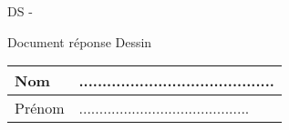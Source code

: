 \documentclass[12pt,landscape]{article}
\begin{document}
\pagestyle{empty}

\begin{minipage}{0.49\linewidth}

\end{minipage}
\hfill
\begin{minipage}{0.49\linewidth}
\begin{center}
\Huge{DS \numero - \sujet}

\vspace{2cm}

\Huge{\jour}

\vspace{2cm}

Document réponse Dessin

\vspace{4cm}
\renewcommand{\arraystretch}{2}
\begin{tabular}{|l|l|}
\hline
Nom&..........................................\\
\hline
Prénom&..........................................\\
\hline
\end{tabular}
\end{center}
\end{minipage}

	

\end{document}
